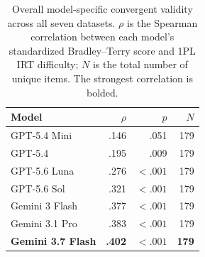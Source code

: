 \documentclass[11pt]{article}
\begin{document}
\begin{table}[h!]
  \centering
  \small
  \begin{tabular}{lrrr}
    \toprule
    Model & $\rho$ & $p$ & $N$ \\
    \midrule
    GPT-5.4 Mini       & .146 & .051   & 179 \\
    GPT-5.4            & .195 & .009   & 179 \\
    GPT-5.6 Luna       & .276 & $<.001$ & 179 \\
    GPT-5.6 Sol        & .321 & $<.001$ & 179 \\
    Gemini 3 Flash     & .377 & $<.001$ & 179 \\
    Gemini 3.1 Pro     & .383 & $<.001$ & 179 \\
    \textbf{Gemini 3.7 Flash} & \textbf{.402} & \textbf{$<.001$} & \textbf{179} \\
    \bottomrule
  \end{tabular}
  \caption{Overall model-specific convergent validity across all seven datasets. $\rho$ is the Spearman correlation between each model's standardized Bradley--Terry score and 1PL IRT difficulty; $N$ is the total number of unique items. The strongest correlation is bolded.}
  \label{tab:model_spearman_overall}
\end{table}
\end{document}
